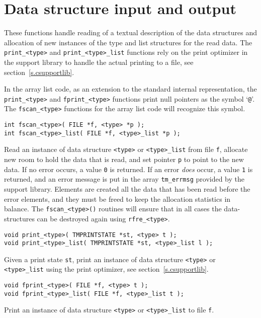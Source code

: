 \section{Data structure input and output}
These functions handle reading of a textual description of the data structures
and allocation of new instances of the type and list structures for the
read data.
The {\tt print\_<type>} and {\tt print\_<type>\_list} functions rely on the
print optimizer in the
{\C} support library to handle the actual printing to a file,
see section~\ref{s.csupportlib}.
\par
\begin{sloppypar}
In the array list code,
as an extension to the standard {\Tm} internal representation,
the \verb!print_<type>! and \verb'fprint_<type>' functions print null
pointers as the symbol `{\tt @}'.
The \verb+fscan_<type>+ functions for the array list code will recognize
this symbol.
\end{sloppypar}
\begin{verbatim}
int fscan_<type>( FILE *f, <type> *p );
int fscan_<type>_list( FILE *f, <type>_list *p );
\end{verbatim}
\begin{desc}
Read an instance of data structure {\tt <type>} or {\tt <type>\_list}
from file {\tt f},
allocate new room to hold the data that is read,
and set pointer {\tt p} to point to the new data.
If no error occurs, a value {\tt 0} is returned.
If an error {\em does} \/occur,
a value {\tt 1} is returned, and an error message is put in the array
{\tt tm\_errmsg} provided by the {\C} support library.
Elements are created all the data that has been read before the error elements,
and they must be freed to keep the allocation statistics in balance.
The \verb+fscan_<type>()+ routines will ensure that in all cases the
data-structures can be destroyed again using \verb+rfre_<type>+.
\end{desc}
\begin{verbatim}
void print_<type>( TMPRINTSTATE *st, <type> t );
void print_<type>_list( TMPRINTSTATE *st, <type>_list l );
\end{verbatim}
\begin{desc}
Given a print state {\tt st},
print an instance of data structure {\tt <type>} or {\tt <type>\_list}
using the print optimizer, see section~\ref{s.csupportlib}.
\end{desc}
\begin{verbatim}
void fprint_<type>( FILE *f, <type> t );
void fprint_<type>_list( FILE *f, <type>_list t );
\end{verbatim}
\begin{desc}
Print an instance of data structure {\tt <type>} or {\tt <type>\_list}
to file {\tt f}.
\end{desc}
